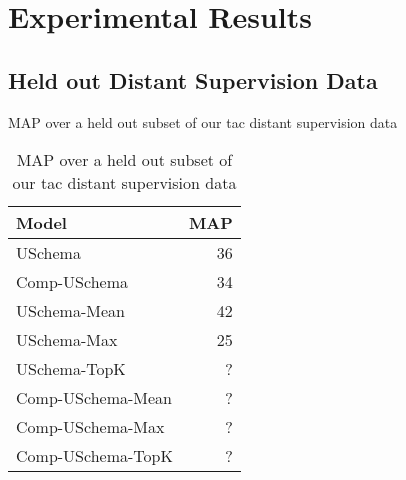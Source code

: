 \section{Experimental Results\label{sec:results}}


\subsection {Held out Distant Supervision Data}
MAP over a held out subset of our tac distant supervision data


\begin{table}[h!]
\setlength{\tabcolsep}{4.1pt}
\begin{center}
\begin{tabular}{|lr|}
\hline
\bf Model & MAP \\
\hline\hline
USchema              & 36 \\
Comp-USchema         & 34  \\
\hline\hline
USchema-Mean         & 42 \\
USchema-Max          & 25  \\
USchema-TopK         & ?  \\
Comp-USchema-Mean    & ?  \\
Comp-USchema-Max     & ? \\
Comp-USchema-TopK    & ?  \\
\hline

\hline
\end{tabular}
\caption{MAP over a held out subset of our tac distant supervision data
\label{distant-supervision-table}}
\end{center}
\vspace{-.3cm}
\end{table}
